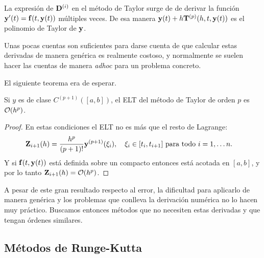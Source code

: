 \begin{remark}
    La expresión de $\vb{D}^{(i)}$ en el método de Taylor surge
    de de derivar la función $\vb{y}{}'(t) = \vb{f}{}(t, \vb{y}{}(t))$ múltiples veces.
    De esa manera $\vb{y}{}(t) + h\vb{T}^{(p)}(h, t, \vb{y}{}(t))$ es el
    polinomio de Taylor de $\vb{y}{}$.
\end{remark}

Unas pocas cuentas son suficientes para darse cuenta de que
calcular estas derivadas de manera genérica es realmente costoso,
y normalmente se suelen hacer las cuentas de manera \emph{adhoc}
para un problema concreto.


El siguiente teorema era de esperar.

\begin{theorem}
    Si $y$ es de clase $C^{(p+1)}([a, b])$,
    el ELT del método de Taylor de orden $p$ es $\vb{\mathcal{O}}{}(h^p)$.
\end{theorem}

\begin{proof}
    En estas condiciones el ELT no es más que el resto de Lagrange:
    \begin{equation*}
        \ELT_{i+1}(h) = \frac{h^p}{(p+1)!} \vy^{(p+1)}(\xi_i),
            \qq{$\xi_i \in [t_i, t_{i+1}]$ para todo $i = 1,\ldots n$.}
    \end{equation*}
    Y si $\vb{f}{}(t, \vb{y}{}(t))$ está definida sobre un compacto
    entonces está acotada en $[a, b]$,
    y por lo tanto $\vb{Z}{}_{i+1}(h) = \vb{\mathcal{O}}{}(h^p)$.
\end{proof}

A pesar de este gran resultado respecto al error,
la dificultad para aplicarlo de manera genérica y
los problemas que conlleva la derivación numérica no lo hacen muy práctico.
Buscamos entonces métodos que no necesiten estas derivadas
y que tengan órdenes similares.

\subsection{Métodos de Runge-Kutta}

\newcommand{\vbeta}{\vb*{\beta}}

